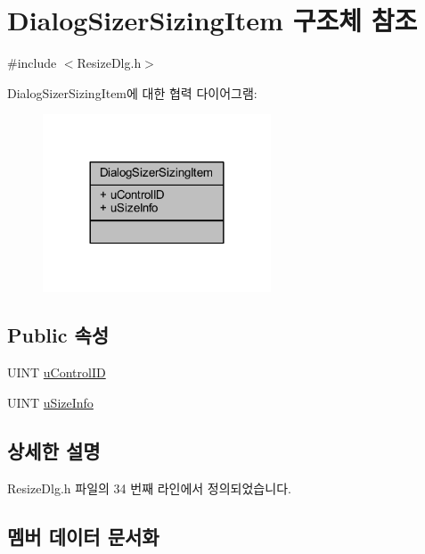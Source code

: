 \hypertarget{struct_dialog_sizer_sizing_item}{}\section{Dialog\+Sizer\+Sizing\+Item 구조체 참조}
\label{struct_dialog_sizer_sizing_item}


{\ttfamily \#include $<$Resize\+Dlg.\+h$>$}



Dialog\+Sizer\+Sizing\+Item에 대한 협력 다이어그램\+:\nopagebreak
\begin{figure}[H]
\begin{center}
\leavevmode
\includegraphics[width=192pt]{struct_dialog_sizer_sizing_item__coll__graph}
\end{center}
\end{figure}
\subsection*{Public 속성}
\begin{DoxyCompactItemize}
\item 
U\+I\+NT \mbox{\hyperlink{struct_dialog_sizer_sizing_item_a2896a44af48c19cab4fb847bcf8fd755}{u\+Control\+ID}}
\item 
U\+I\+NT \mbox{\hyperlink{struct_dialog_sizer_sizing_item_af673815342f29c205ec14476c57269c2}{u\+Size\+Info}}
\end{DoxyCompactItemize}


\subsection{상세한 설명}


Resize\+Dlg.\+h 파일의 34 번째 라인에서 정의되었습니다.



\subsection{멤버 데이터 문서화}
\mbox{\label{struct_dialog_sizer_sizing_item_a2896a44af48c19cab4fb847bcf8fd755}} 
